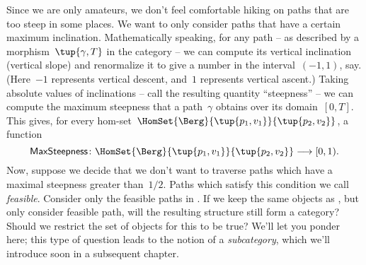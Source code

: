 Since we are only amateurs, we don't feel comfortable hiking on paths that are too steep in some places.
We want to only consider paths that have a certain maximum inclination.
Mathematically speaking, for any path -- as described by a morphism~$\tup{\gamma, T}$ in the category \Berg -- we can compute its vertical inclination (vertical slope) and renormalize it to give a number in the interval~$(-1, 1)$, say.
(Here~$-1$ represents vertical descent, and~$1$ represents vertical ascent.) Taking absolute values of inclinations -- call the resulting quantity ``steepness'' -- we can compute the maximum steepness that a path~$\gamma$ obtains over its domain~$[0,T]$.
This gives, for every hom-set~$\HomSet{\Berg}{\tup{p_1, v_1}}{\tup{p_2, v_2}}$, a function
\begin{equation}
    \mathsf{MaxSteepness}\colon \HomSet{\Berg}{\tup{p_1, v_1}}{\tup{p_2, v_2}} \longrightarrow [0, 1).
\end{equation}
Now, suppose we decide that we don't want to traverse paths which have a maximal steepness greater than~$1/2$.
Paths which satisfy this condition we call \emph{feasible}.
Consider only the feasible paths in \Berg.
If we keep the same objects as \Berg, but only consider feasible path, will the resulting structure still form a category?
Should we restrict the set of objects for this to be true?
We'll let you ponder here; this type of question leads to the notion of a \emph{subcategory}, which we'll introduce soon in a subsequent chapter.

